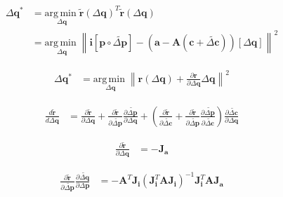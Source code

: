 \begin{equation}
    \begin{aligned}
        \Delta\mathbf{q}^* & = \underset{\Delta\mathbf{q}}{\mathrm{arg\,min\;}} \tilde{\mathbf{r}}(\Delta\mathbf{q})^T \tilde{\mathbf{r}}(\Delta\mathbf{q}) 
        \\
        & = \underset{\Delta\mathbf{q}}{\mathrm{arg\,min\;}}  \left\| \mathbf{i}[\mathbf{p} \circ \tilde{\Delta \mathbf{p}}] - (\mathbf{a} - \mathbf{A}(\mathbf{c} + \tilde{\Delta \mathbf{c}}))[\Delta \mathbf{q}] \right\|^2
    \label{eq:ssd_appearance}
    \end{aligned}
\end{equation}

\begin{equation}
    \begin{aligned}
        \Delta\mathbf{q}^* & = \underset{\Delta\mathbf{q}}{\mathrm{arg\,min\;}}  \left\| \mathbf{r}(\Delta\mathbf{q}) + \frac{\partial\mathbf{r}}{\partial\Delta\mathbf{q}} \Delta\mathbf{q} \right\|^2
    \label{eq:ssd_appearance}
    \end{aligned}
\end{equation}

\begin{equation}
    \begin{aligned}
        \frac{d \tilde{\mathbf{r}}}{d \Delta \mathbf{q}} & = \frac{\partial \tilde{\mathbf{r}}}{\partial \Delta \mathbf{q}} + \frac{\partial \tilde{\mathbf{r}}}{\partial \tilde{\Delta \mathbf{p}}} \frac{\partial \tilde{\Delta \mathbf{p}}}{\partial \Delta \mathbf{q}} + \left( \frac{\partial\tilde{\mathbf{r}}}{\partial \tilde{\Delta \mathbf{c}}} + \frac{\partial \tilde{\mathbf{r}}}{\partial \tilde{\Delta \mathbf{p}}} \frac{\partial \tilde{\Delta \mathbf{p}}}{\partial \tilde{\Delta \mathbf{c}}} \right) \frac{\partial \tilde{\Delta \mathbf{c}}}{\partial \Delta \mathbf{q}} 
    \label{eq:wiberg_appearance}
    \end{aligned}
\end{equation}

\begin{equation}
    \begin{aligned}
        \frac{\partial \tilde{\mathbf{r}}}{\partial \Delta \mathbf{q}} &= - \mathbf{J}_{\mathbf{a}}
    \label{eq:wiberg_inverse1}
    \end{aligned}
\end{equation}

\begin{equation}
    \begin{aligned}
        \frac{\partial \tilde{\mathbf{r}}}{\partial \tilde{\Delta \mathbf{p}}} \frac{\partial \tilde{\Delta \mathbf{q}}}{\partial \Delta \mathbf{p}} & = - \mathbf{A}^T \mathbf{J}_{\mathbf{i}} \left( \mathbf{J}_{\mathbf{i}}^T \mathbf{A} \mathbf{J}_{\mathbf{i}} \right)^{-1} \mathbf{J}_{\mathbf{i}}^T \mathbf{A} \mathbf{J}_{\mathbf{a}}
    \label{eq:wiberg_inverse2}
    \end{aligned}
\end{equation}

